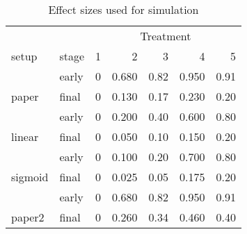 \begin{table}

\caption{\label{tab:}Effect sizes used for simulation}
\centering
\begin{tabular}[t]{llrrrrr}
\toprule
\multicolumn{2}{c}{ } & \multicolumn{5}{c}{Treatment} \\
\cmidrule(l{3pt}r{3pt}){3-7}
setup & stage & 1 & 2 & 3 & 4 & 5\\
\midrule
 & early & 0 & 0.680 & 0.82 & 0.950 & 0.91\\

\multirow{-2}{*}{\raggedright\arraybackslash paper} & final & 0 & 0.130 & 0.17 & 0.230 & 0.20\\
\cmidrule{1-7}
 & early & 0 & 0.200 & 0.40 & 0.600 & 0.80\\

\multirow{-2}{*}{\raggedright\arraybackslash linear} & final & 0 & 0.050 & 0.10 & 0.150 & 0.20\\
\cmidrule{1-7}
 & early & 0 & 0.100 & 0.20 & 0.700 & 0.80\\

\multirow{-2}{*}{\raggedright\arraybackslash sigmoid} & final & 0 & 0.025 & 0.05 & 0.175 & 0.20\\
\cmidrule{1-7}
 & early & 0 & 0.680 & 0.82 & 0.950 & 0.91\\

\multirow{-2}{*}{\raggedright\arraybackslash paper2} & final & 0 & 0.260 & 0.34 & 0.460 & 0.40\\
\bottomrule
\end{tabular}
\end{table}
